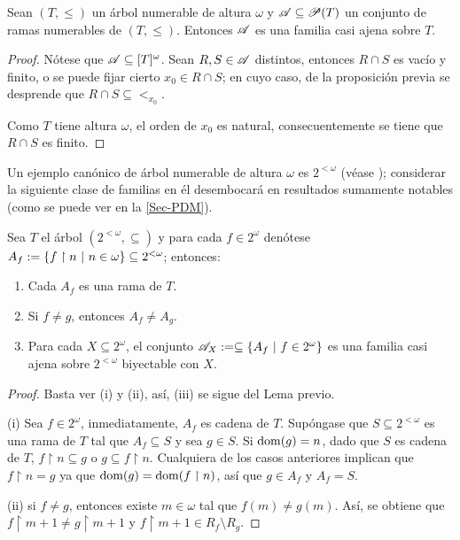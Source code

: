\begin{proposicion}
	Sean $(T,\leq)$ un árbol numerable de altura $\omega$ y $\mathscr{A} \subseteq \mathscr{P}(T)$ un conjunto de ramas numerables de $(T,\leq)$. Entonces $\mathscr{A}$ es una familia casi ajena sobre $T$.
\end{proposicion}

\begin{proof}
	Nótese que $\mathscr{A} \subseteq [T]^\omega$. Sean $R,S \in \mathscr{A}$ distintos, entonces $R \cap S$ es vacío y finito, o se puede fijar cierto $x_0 \in R \cap S$; en cuyo caso, de la proposición previa se desprende que $R \cap S \subseteq <_{x_0}$.

	Como $T$ tiene altura $\omega$, el orden de $x_0$ es natural, consecuentemente se tiene que $R \cap S$ es finito.
\end{proof}

Un ejemplo canónico de árbol numerable de altura $\omega$ es $2^{<\omega}$ (véase \pageref{arbol-2Ramas}); considerar la siguiente clase de familias en él desembocará en resultados sumamente notables (como se puede ver en la \autoref{Sec-PDM}).

\begin{proposicion}
	Sea $T$ el árbol $(2^{<\omega},\subseteq)$ y para cada $f \in 2^\omega$ denótese $A_f:=\{ f \upharpoonright n \text{ $|$ } n \in \omega \} \subseteq 2^{<\omega}$; entonces:
	\begin{enumerate}
		\item Cada $A_f$ es una rama de $T$.
		\item Si $f\neq g$, entonces $A_f \neq A_g$.
		\item Para cada $X \subseteq 2^\omega$, el conjunto $\mathscr{A}_X := \subseteq \{A_f \text{ $|$ } f \in 2^\omega\}$ es una familia casi ajena sobre $2^{<\omega}$ biyectable con $X$.
	\end{enumerate}
\end{proposicion}
\begin{proof}
	Basta ver (i) y (ii), así, (iii) se sigue del Lema previo.

	(i) Sea $f \in 2^\omega$, inmediatamente, $A_f$ es cadena de $T$. Supóngase que $S \subseteq 2^{<\omega}$ es una rama de $T$ tal que $A_f \subseteq S$ y sea $g \in S$. Si $\operatorname{dom}(g)=n$, dado que $S$ es cadena de $T$, $f \upharpoonright n \subseteq g$ o $g \subseteq f \upharpoonright n$. Cualquiera de los casos anteriores implican que $f \upharpoonright n = g$ ya que $\operatorname{dom}(g)=\operatorname{dom}(f \upharpoonright n)$, así que $g \in A_f$ y $A_f = S$.

	(ii) si $f \neq g$, entonces existe $m\in \omega$ tal que $f(m) \neq g(m)$. Así, se obtiene que $f \upharpoonright m+1 \neq g \upharpoonright m+1$ y $f \upharpoonright m+1 \in R_f \setminus R_g$.
\end{proof}

